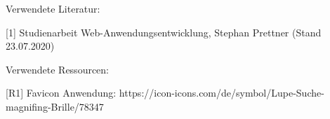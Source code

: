 \documentclass[12pt,oneside]{report}
\begin{document}
  
   
  
  
  
  
 
  
  
  \nocite{*}
  Verwendete Literatur:
  
  [1] Studienarbeit Web-Anwendungsentwicklung, Stephan Prettner (Stand 23.07.2020)
  
  Verwendete Ressourcen:
  
  [R1] Favicon Anwendung: https://icon-icons.com/de/symbol/Lupe-Suche-magnifing-Brille/78347
  \newpage
  
%
%  
%
  
\end{document}
